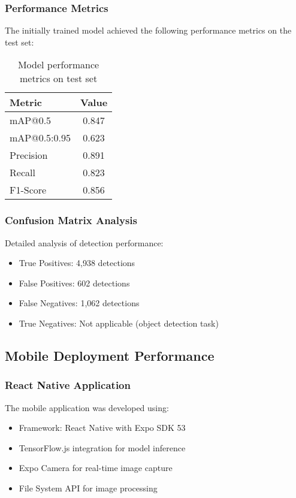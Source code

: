 \documentclass[12pt,a4paper]{article}
\begin{document}
\subsubsection{Performance Metrics}
The initially trained model achieved the following performance metrics on the test set:
\begin{table}[H]
\centering
\begin{tabular}{lc}
\toprule
\textbf{Metric} & \textbf{Value} \\
\midrule
mAP@0.5 & 0.847 \\
mAP@0.5:0.95 & 0.623 \\
Precision & 0.891 \\
Recall & 0.823 \\
F1-Score & 0.856 \\
\bottomrule
\end{tabular}
\caption{Model performance metrics on test set}
\label{tab:performance_metrics}
\end{table}

\subsubsection{Confusion Matrix Analysis}
Detailed analysis of detection performance:
\begin{itemize}
    \item True Positives: 4,938 detections
    \item False Positives: 602 detections
    \item False Negatives: 1,062 detections
    \item True Negatives: Not applicable (object detection task)
\end{itemize}

\subsection{Mobile Deployment Performance}

\subsubsection{React Native Application}
The mobile application was developed using:
\begin{itemize}
    \item Framework: React Native with Expo SDK 53
    \item TensorFlow.js integration for model inference
    \item Expo Camera for real-time image capture
    \item File System API for image processing
\end{itemize}
\end{document}

